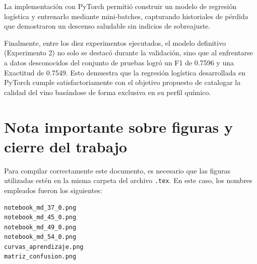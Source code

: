 \documentclass[conference]{IEEEtran}
\begin{document}
La implementación con PyTorch permitió construir un modelo de regresión logística y entrenarlo mediante mini-batches, capturando historiales de pérdida que demostraron un descenso saludable sin indicios de sobreajuste.

Finalmente, entre los diez experimentos ejecutados, el modelo definitivo (Experimento 2) no solo se destacó durante la validación, sino que al enfrentarse a datos desconocidos del conjunto de pruebas logró un F1 de 0.7596 y una Exactitud de 0.7549. Esto demuestra que la regresión logística desarrollada en PyTorch cumple satisfactoriamente con el objetivo propuesto de catalogar la calidad del vino basándose de forma exclusiva en su perfil químico.

\section*{Nota importante sobre figuras y cierre del trabajo}

Para compilar correctamente este documento, es necesario que las figuras utilizadas estén en la misma carpeta del archivo \texttt{.tex}. En este caso, los nombres empleados fueron los siguientes:

\begin{verbatim}
notebook_md_37_0.png
notebook_md_45_0.png
notebook_md_49_0.png
notebook_md_54_0.png
curvas_aprendizaje.png
matriz_confusion.png
\end{verbatim}
\end{document}
